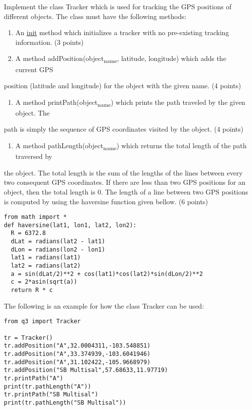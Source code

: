 \documentclass[11pt]{article}
\begin{document}
Implement the class Tracker which is used for tracking the GPS positions of different objects. The
class must have the following methods:
\begin{enumerate}
\item An \uline{\uline{init}} method which initializes a tracker with no pre-existing tracking information. (3 points)
\item A method addPosition(object\textsubscript{name}, latitude, longitude) which adds the current GPS
\end{enumerate}
position (latitude and longitude) for the object with the given name. (4 points)
\begin{enumerate}
\item A method printPath(object\textsubscript{name}) which prints the path traveled by the given object. The
\end{enumerate}
path is simply the sequence of GPS coordinates visited by the object. (4 points)
\begin{enumerate}
\item A method pathLength(object\textsubscript{name}) which returns the total length of the path traversed by
\end{enumerate}
the object. The total length is the sum of the lengths of the lines between every two
consequent GPS coordinates. If there are less than two GPS positions for an object, then
the total length is 0. The length of a line between two GPS positions is computed by using
the haversine function given bellow. (6 points)

\begin{verbatim}
from math import *
def haversine(lat1, lon1, lat2, lon2):
  R = 6372.8
  dLat = radians(lat2 - lat1)
  dLon = radians(lon2 - lon1)
  lat1 = radians(lat1)
  lat2 = radians(lat2)
  a = sin(dLat/2)**2 + cos(lat1)*cos(lat2)*sin(dLon/2)**2
  c = 2*asin(sqrt(a))
  return R * c
\end{verbatim}

The following is an example for how the class Tracker can be used:

\begin{verbatim}
from q3 import Tracker

tr = Tracker()
tr.addPosition("A",32.0004311,-103.548851)
tr.addPosition("A",33.374939,-103.6041946)
tr.addPosition("A",31.102422,-105.9668979)
tr.addPosition("SB Multisal",57.68633,11.97719)
tr.printPath("A")
print(tr.pathLength("A"))
tr.printPath("SB Multisal")
print(tr.pathLength("SB Multisal"))
\end{verbatim}
\end{document}
